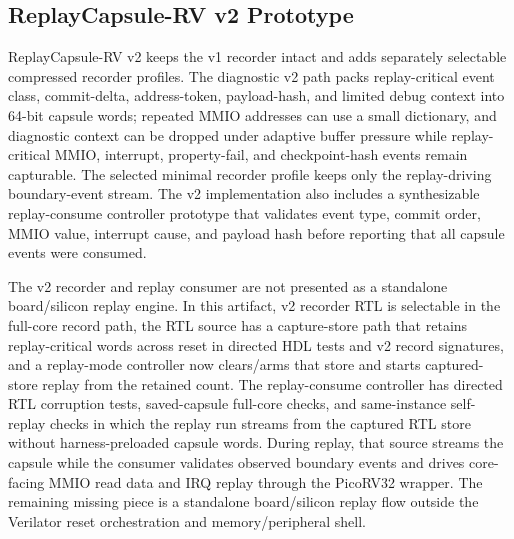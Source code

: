 \subsection{ReplayCapsule-RV v2 Prototype}

ReplayCapsule-RV v2 keeps the v1 recorder intact and adds separately selectable compressed recorder profiles. The diagnostic v2 path packs replay-critical event class, commit-delta, address-token, payload-hash, and limited debug context into 64-bit capsule words; repeated MMIO addresses can use a small dictionary, and diagnostic context can be dropped under adaptive buffer pressure while replay-critical MMIO, interrupt, property-fail, and checkpoint-hash events remain capturable. The selected minimal recorder profile keeps only the replay-driving boundary-event stream. The v2 implementation also includes a synthesizable replay-consume controller prototype that validates event type, commit order, MMIO value, interrupt cause, and payload hash before reporting that all capsule events were consumed.

The v2 recorder and replay consumer are not presented as a standalone board/silicon replay engine. In this artifact, v2 recorder RTL is selectable in the full-core record path, the RTL source has a capture-store path that retains replay-critical words across reset in directed HDL tests and v2 record signatures, and a replay-mode controller now clears/arms that store and starts captured-store replay from the retained count. The replay-consume controller has directed RTL corruption tests, saved-capsule full-core checks, and same-instance self-replay checks in which the replay run streams from the captured RTL store without harness-preloaded capsule words. During replay, that source streams the capsule while the consumer validates observed boundary events and drives core-facing MMIO read data and IRQ replay through the PicoRV32 wrapper. The remaining missing piece is a standalone board/silicon replay flow outside the Verilator reset orchestration and memory/peripheral shell.
